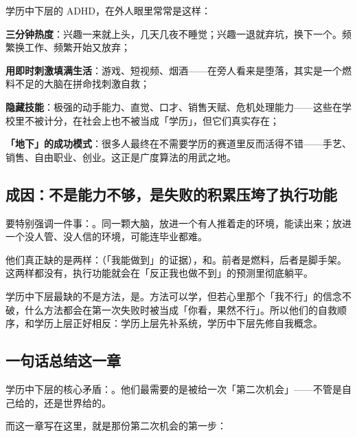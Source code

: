 学历中下层的 ADHD，在外人眼里常常是这样：

\begin{checklist}
  \item \textbf{三分钟热度}：兴趣一来就上头，几天几夜不睡觉；兴趣一退就弃坑，换下一个。频繁换工作、频繁开始又放弃；
  \item \textbf{用即时刺激填满生活}：游戏、短视频、烟酒——在旁人看来是堕落，其实是一个燃料不足的大脑在拼命找刺激自救；
  \item \textbf{隐藏技能}：极强的动手能力、直觉、口才、销售天赋、危机处理能力——这些在学校里不被计分，在社会上也不被当成「学历」，但它们真实存在；
  \item \textbf{「地下」的成功模式}：很多人最终在不需要学历的赛道里反而活得不错——手艺、销售、自由职业、创业。这正是广度算法的用武之地。
\end{checklist}

\subsection{成因：不是能力不够，是失败的积累压垮了执行功能}

要特别强调一件事：。同一颗大脑，放进一个有人推着走的环境，能读出来；放进一个没人管、没人信的环境，可能连毕业都难。

他们真正缺的是两样：（「我能做到」的证据），和。前者是燃料，后者是脚手架。这两样都没有，执行功能就会在「反正我也做不到」的预测里彻底躺平。

\begin{insight}
学历中下层最缺的不是方法，是。方法可以学，但若心里那个「我不行」的信念不破，什么方法都会在第一次失败时被当成「你看，果然不行」。所以他们的自救顺序，和学历上层正好相反：学历上层先补系统，学历中下层先修自我概念。
\end{insight}

\subsection{一句话总结这一章}

学历中下层的核心矛盾：。他们最需要的是被给一次「第二次机会」——不管是自己给的，还是世界给的。

而这一章写在这里，就是那份第二次机会的第一步：
